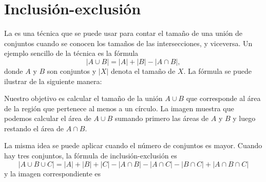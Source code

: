 \section{Inclusión-exclusión}


La  es una técnica
que se puede usar para contar el tamaño
de una unión de conjuntos cuando se conocen los tamaños de
las intersecciones, y viceversa.
Un ejemplo sencillo de la técnica es la fórmula
\[ |A \cup B| = |A| + |B| - |A \cap B|,\]
donde $A$ y $B$ son conjuntos y $|X|$
denota el tamaño de $X$.
La fórmula se puede ilustrar de la siguiente manera:

\begin{center}
\end{center}

Nuestro objetivo es calcular
el tamaño de la unión $A \cup B$
que corresponde al área de la región
que pertenece al menos a un círculo.
La imagen muestra que podemos calcular
el área de $A \cup B$ sumando primero las
áreas de $A$ y $B$ y luego restando
el área de $A \cap B$.

La misma idea se puede aplicar cuando el número
de conjuntos es mayor.
Cuando hay tres conjuntos, la fórmula de inclusión-exclusión es
\[ |A \cup B \cup C| = |A| + |B| + |C| - |A \cap B|  - |A \cap C|  - |B \cap C| + |A \cap B \cap C| \]
y la imagen correspondiente es

\begin{center}
\end{center}

